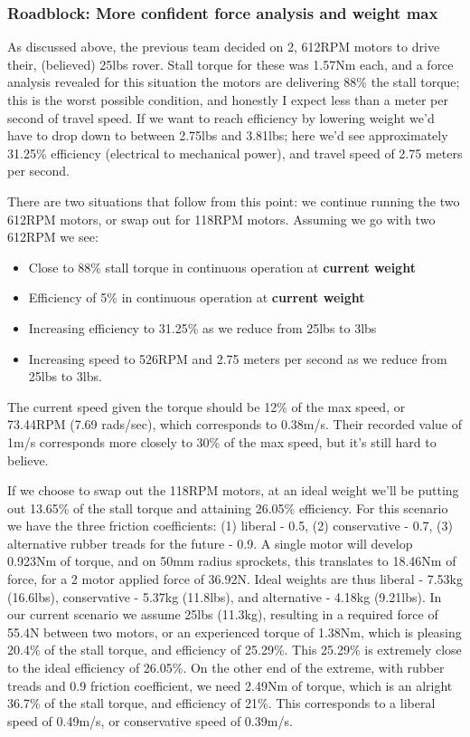 \documentclass[a4paper, 10pt]{article}
\begin{document}
		\subsubsection{Roadblock: More confident force analysis and weight max}		
		As discussed above, the previous team decided on 2, 612RPM motors to drive their, (believed) 25lbs rover. Stall torque for these was 1.57Nm each, and a force analysis revealed for this situation the motors are delivering 88\% the stall torque; this is the worst possible condition, and honestly I expect less than a meter per second of travel speed. If we want to reach efficiency by lowering weight we'd have to drop down to between 2.75lbs and 3.81lbs; here we'd see approximately 31.25\% efficiency (electrical to mechanical power), and travel speed of 2.75 meters per second. 
		
		There are two situations that follow from this point: we continue running the two 612RPM motors, or swap out for 118RPM motors. Assuming we go with two 612RPM we see:
		\begin{itemize}
			\item Close to 88\% stall torque in continuous operation at \textbf{current weight}
			\item Efficiency of 5\% in continuous operation at \textbf{current weight}
			\item Increasing efficiency to 31.25\% as we reduce from 25lbs to 3lbs
			\item Increasing speed to 526RPM and 2.75 meters per second as we reduce from 25lbs to 3lbs.
		\end{itemize}
		The current speed given the torque should be 12\% of the max speed, or 73.44RPM (7.69 rads/sec), which corresponds to 0.38m/s. Their recorded value of 1m/s corresponds more closely to 30\% of the max speed, but it's still hard to believe.
		
		If we choose to swap out the 118RPM motors, at an ideal weight we'll be putting out 13.65\% of the stall torque and attaining 26.05\% efficiency. For this scenario we have the three friction coefficients: (1) liberal - 0.5, (2) conservative - 0.7, (3) alternative rubber treads for the future - 0.9. A single motor will develop 0.923Nm of torque, and on 50mm radius sprockets, this translates to 18.46Nm of force, for a 2 motor applied force of 36.92N. Ideal weights are thus liberal - 7.53kg (16.6lbs), conservative - 5.37kg (11.8lbs), and alternative - 4.18kg (9.21lbs). In our current scenario we assume 25lbs (11.3kg), resulting in a required force of 55.4N between two motors, or an experienced torque of 1.38Nm, which is pleasing 20.4\% of the stall torque, and efficiency of 25.29\%. This 25.29\% is extremely close to the ideal efficiency of 26.05\%. On the other end of the extreme, with rubber treads and 0.9 friction coefficient,  we need 2.49Nm of torque, which is an alright 36.7\% of the stall torque, and efficiency of 21\%. This corresponds to a liberal speed of 0.49m/s, or conservative speed of 0.39m/s. 
		
\end{document}
